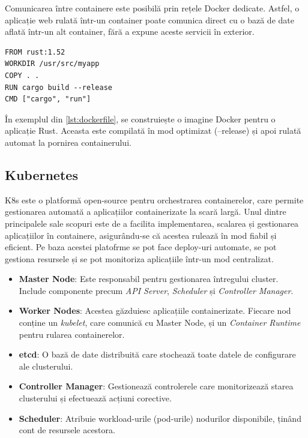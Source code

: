 \documentclass[titlepage,12pt]{article}
\DeclareRobustCommand{\code}[1]{{\ttfamily\small #1}}
\begin{document}
Comunicarea între containere este posibilă prin rețele Docker dedicate.
Astfel, o aplicație web rulată într-un container poate comunica direct cu o bază de date aflată într-un alt container, fără a expune aceste servicii în exterior.

\begin{lstlisting}[language=docker,caption={Exemplu Dockerfile},label={lst:dockerfile}]
FROM rust:1.52
WORKDIR /usr/src/myapp
COPY . .
RUN cargo build --release
CMD ["cargo", "run"]
\end{lstlisting}

În exemplul din \cref{lst:dockerfile}, se construiește o imagine Docker pentru o aplicație Rust.
Aceasta este compilată în mod optimizat (\code{--release}) și apoi rulată automat la pornirea containerului.

\subsection{Kubernetes}

\ac {K8s} este o platformă open-source pentru orchestrarea containerelor, care permite gestionarea automată a aplicațiilor containerizate la scară largă. Unul dintre principalele sale scopuri este de a facilita implementarea, scalarea și gestionarea aplicațiilor în containere, asigurându-se că acestea rulează în mod fiabil și eficient.
Pe baza acestei platofrme se pot face deploy-uri automate, se pot gestiona resursele și se pot monitoriza aplicațiile într-un mod centralizat.

\begin{itemize}
    \item \textbf{Master Node}: Este responsabil pentru gestionarea întregului cluster. Include componente precum \textit{API Server}, \textit{Scheduler} și \textit{Controller Manager}.
    \item \textbf{Worker Nodes}: Acestea găzduiesc aplicațiile containerizate. Fiecare nod conține un \textit{kubelet}, care comunică cu Master Node, și un \textit{Container Runtime} pentru rularea containerelor.
    \item \textbf{etcd}: O bază de date distribuită care stochează toate datele de configurare ale clusterului.
    \item \textbf{Controller Manager}: Gestionează controlerele care monitorizează starea clusterului și efectuează acțiuni corective.
    \item \textbf{Scheduler}: Atribuie workload-urile (pod-urile) nodurilor disponibile, ținând cont de resursele acestora.
\end{itemize}
\end{document}
